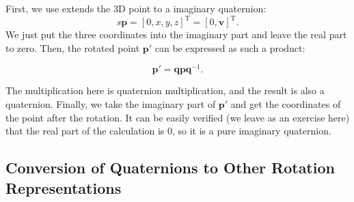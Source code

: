 First, we use extends the 3D point to a imaginary quaternion:
\[s
\mathbf{p} = [0, x, y, z]^\mathrm{T} = [0, \mathbf{v}]^\mathrm{T}. 
\]
We just put the three coordinates into the imaginary part and leave the real part to zero. Then, the rotated point $ \mathbf {p}' $ can be expressed as such a product:

\begin{equation}\label{eq:rotate-with-quaternion}
\mathbf{p}' = \mathbf{q} \mathbf{p} \mathbf{q}^{-1}.
\end{equation}

The multiplication here is quaternion multiplication, and the result is also a quaternion. Finally, we take the imaginary part of $ \mathbf{p}' $ and get the coordinates of the point after the rotation. It can be easily verified (we leave as an exercise here) that the real part of the calculation is 0, so it is a pure imaginary quaternion.

\subsection{Conversion of Quaternions to Other Rotation Representations}

